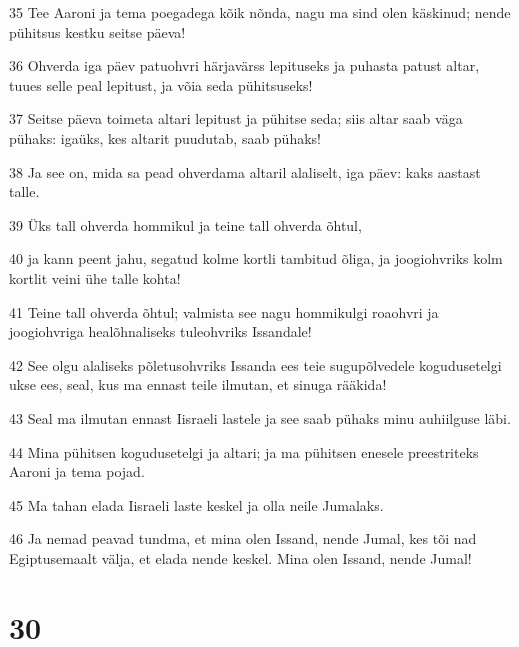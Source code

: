 \par 35 Tee Aaroni ja tema poegadega kõik nõnda, nagu ma sind olen käskinud; nende pühitsus kestku seitse päeva!
\par 36 Ohverda iga päev patuohvri härjavärss lepituseks ja puhasta patust altar, tuues selle peal lepitust, ja võia seda pühitsuseks!
\par 37 Seitse päeva toimeta altari lepitust ja pühitse seda; siis altar saab väga pühaks: igaüks, kes altarit puudutab, saab pühaks!
\par 38 Ja see on, mida sa pead ohverdama altaril alaliselt, iga päev: kaks aastast talle.
\par 39 Üks tall ohverda hommikul ja teine tall ohverda õhtul,
\par 40 ja kann peent jahu, segatud kolme kortli tambitud õliga, ja joogiohvriks kolm kortlit veini ühe talle kohta!
\par 41 Teine tall ohverda õhtul; valmista see nagu hommikulgi roaohvri ja joogiohvriga healõhnaliseks tuleohvriks Issandale!
\par 42 See olgu alaliseks põletusohvriks Issanda ees teie sugupõlvedele kogudusetelgi ukse ees, seal, kus ma ennast teile ilmutan, et sinuga rääkida!
\par 43 Seal ma ilmutan ennast Iisraeli lastele ja see saab pühaks minu auhiilguse läbi.
\par 44 Mina pühitsen kogudusetelgi ja altari; ja ma pühitsen enesele preestriteks Aaroni ja tema pojad.
\par 45 Ma tahan elada Iisraeli laste keskel ja olla neile Jumalaks.
\par 46 Ja nemad peavad tundma, et mina olen Issand, nende Jumal, kes tõi nad Egiptusemaalt välja, et elada nende keskel. Mina olen Issand, nende Jumal!

\chapter{30}

